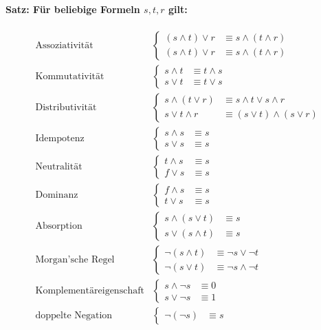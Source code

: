 \documentclass[10pt,a4paper]{article}
\begin{document}
\paragraph{Satz: Für beliebige Formeln $s,t,r$ gilt:}
\begin{align*}
\text{Assoziativität}&\begin{cases}
(s \land t) \lor r &\equiv s \land (t \land r)\\
(s \land t) \lor r &\equiv s \land (t \land r)
\end{cases} \\
%
\text{Kommutativität}&\begin{cases}
s \land t &\equiv t \land s\\
s \lor t &\equiv t \lor s
\end{cases} \\
%
\text{Distributivität}&\begin{cases}
s \land (t \lor r) &\equiv s \land t \lor s \land r\\
s \lor t \land r &\equiv (s \lor t) \land (s \lor r)
\end{cases} \\
%
\text{Idempotenz}&\begin{cases}
s \land s &\equiv s \\
s \lor s &\equiv s
\end{cases} \\
%
\text{Neutralität}&\begin{cases}
t \land s &\equiv s \\
f \lor s &\equiv s
\end{cases} \\
%
\text{Dominanz}&\begin{cases}
f \land s &\equiv s \\
t \lor s &\equiv s
\end{cases} \\
%
\text{Absorption}&\begin{cases}
s \land (s \lor t) &\equiv s \\
s \lor (s \land t) &\equiv s
\end{cases} \\
%
\text{Morgan'sche Regel}&\begin{cases}
\neg (s \land t) &\equiv \neg s \lor \neg t\\
\neg (s \lor t) &\equiv \neg s \land \neg t
\end{cases} \\
%
\text{Komplementäreigenschaft}&\begin{cases}
s \land \neg s &\equiv 0 \\
s \lor \neg s &\equiv 1
\end{cases} \\
%
\text{doppelte Negation}&\begin{cases}
\neg (\neg s) &\equiv s
\end{cases} \\
\end{align*}
%
\end{document}
